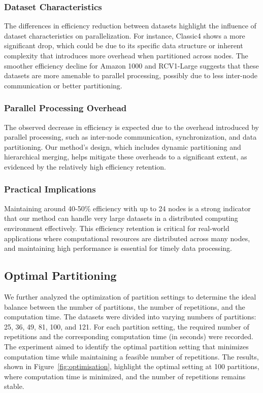 \documentclass[journal]{IEEEtran}
\begin{document}
\subsubsection{Dataset Characteristics}
The differences in efficiency reduction between datasets highlight the influence of dataset characteristics on parallelization. For instance, Classic4 shows a more significant drop, which could be due to its specific data structure or inherent complexity that introduces more overhead when partitioned across nodes. The smoother efficiency decline for Amazon 1000 and RCV1-Large suggests that these datasets are more amenable to parallel processing, possibly due to less inter-node communication or better partitioning.

\subsubsection{Parallel Processing Overhead}
The observed decrease in efficiency is expected due to the overhead introduced by parallel processing, such as inter-node communication, synchronization, and data partitioning. Our method's design, which includes dynamic partitioning and hierarchical merging, helps mitigate these overheads to a significant extent, as evidenced by the relatively high efficiency retention.

\subsubsection{Practical Implications}
Maintaining around 40-50\% efficiency with up to 24 nodes is a strong indicator that our method can handle very large datasets in a distributed computing environment effectively. This efficiency retention is critical for real-world applications where computational resources are distributed across many nodes, and maintaining high performance is essential for timely data processing.

\subsection{Optimal Partitioning}

We further analyzed the optimization of partition settings to determine the ideal balance between the number of partitions, the number of repetitions, and the computation time. The datasets were divided into varying numbers of partitions: 25, 36, 49, 81, 100, and 121. For each partition setting, the required number of repetitions and the corresponding computation time (in seconds) were recorded. The experiment aimed to identify the optimal partition setting that minimizes computation time while maintaining a feasible number of repetitions. The results, shown in Figure~\ref{fig:optimisation}, highlight the optimal setting at 100 partitions, where computation time is minimized, and the number of repetitions remains stable.
\end{document}
